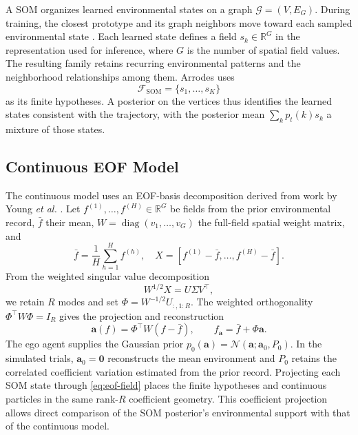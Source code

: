 \documentclass[letterpaper,10pt,conference]{ieeeconf}
\begin{document}
A SOM organizes learned environmental states on a graph $\mathcal G=(V,E_G)$. During training, the closest prototype and its graph neighbors move toward each sampled environmental state \cite{mccammon2024som}. Each learned state defines a field $s_k\in\mathbb R^G$ in the representation used for inference, where $G$ is the number of spatial field values. The resulting family retains recurring environmental patterns and the neighborhood relationships among them. Arrodes uses
\begin{equation}
  \mathcal F_{\mathrm{SOM}}=\{s_1,\ldots,s_K\}
  \label{eq:som-worlds}
\end{equation}
as its finite hypotheses. A posterior on the vertices thus identifies the learned states consistent with the trajectory, with the posterior mean $\sum_k p_t(k)s_k$ a mixture of those states.

\subsection{Continuous EOF Model}

The continuous model uses an EOF-basis decomposition derived from work by Young \emph{et al.} \cite{young2024greedy}. Let $f^{(1)},\ldots,f^{(H)}\in\mathbb R^G$ be fields from the prior environmental record, $\bar f$ their mean, $W=\operatorname{diag}(v_1,\ldots,v_G)$ the full-field spatial weight matrix, and
\begin{equation}
  \bar f=\frac{1}{H}\sum_{h=1}^{H}f^{(h)},\quad
  X=\left[f^{(1)}-\bar f,\ldots,f^{(H)}-\bar f\right].
\end{equation}
From the weighted singular value decomposition
\begin{equation}
  W^{1/2}X=U\Sigma V^\top,
\end{equation}
we retain $R$ modes and set $\Phi=W^{-1/2}U_{:,1:R}$. The weighted orthogonality $\Phi^\top W\Phi=I_R$ gives the projection and reconstruction
\begin{equation}
  \boldsymbol a(f)=\Phi^\top W(f-\bar f),\qquad
  f_{\boldsymbol a}=\bar f+\Phi\boldsymbol a.
  \label{eq:eof-field}
\end{equation}
The ego agent supplies the Gaussian prior $p_0(\boldsymbol a)=\mathcal N(\boldsymbol a;\boldsymbol a_0,P_0)$. In the simulated trials, $\boldsymbol a_0=\boldsymbol0$ reconstructs the mean environment and $P_0$ retains the correlated coefficient variation estimated from the prior record. Projecting each SOM state through \eqref{eq:eof-field} places the finite hypotheses and continuous particles in the same rank-$R$ coefficient geometry. This coefficient projection allows direct comparison of the SOM posterior's environmental support with that of the continuous model.
\end{document}
